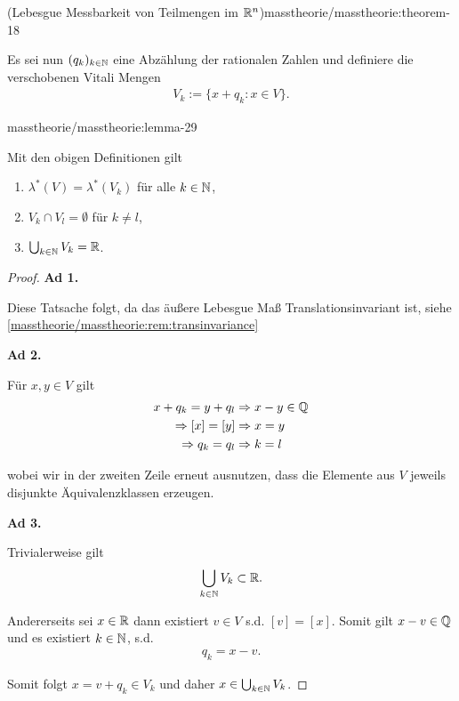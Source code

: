 \begin{theorem}{(Lebesgue Messbarkeit von Teilmengen im \protect\(\mathbb{R}^n\protect\))}{masstheorie/masstheorie:theorem-18}
\par
Es sei nun \((q_k)_{k\in\mathbb{N}}\) eine Abzählung der rationalen Zahlen und definiere die verschobenen Vitali Mengen
\begin{align*}
V_k :=\{x+q_k: x\in V\}.
\end{align*}\begin{lemma}{}{masstheorie/masstheorie:lemma-29}



\par
Mit den obigen Definitionen gilt
\begin{enumerate}

\item {} 
\par
\(\lambda^\ast(V) = \lambda^\ast(V_k)\) für alle \(k\in\mathbb{N}\),

\item {} 
\par
\(V_k\cap V_l=\emptyset\) für \(k\neq l\),

\item {} 
\par
\(\bigcup_{k\in\mathbb{N}} V_k = \mathbb{R}\).

\end{enumerate}
\end{lemma}

\begin{proof}
 

\par
\textbf{Ad 1.}

\par
Diese Tatsache folgt, da das äußere Lebesgue Maß Translationsinvariant ist, siehe \cref{masstheorie/masstheorie:rem:transinvariance} 

\par
\textbf{Ad 2.}

\par
Für \(x,y\in V\) gilt
\begin{align*}
x + q_k = y + q_l&\Rightarrow x-y\in\mathbb{Q}\\
\Rightarrow [x]=[y]&\Rightarrow x=y\\
\Rightarrow q_k=q_l&\Rightarrow k=l
\end{align*}
\par
wobei wir in der zweiten Zeile erneut ausnutzen, dass die Elemente aus \(V\) jeweils disjunkte Äquivalenzklassen erzeugen.

\par
\textbf{Ad 3.}

\par
Trivialerweise gilt
\begin{align*}
\bigcup_{k\in\mathbb{N}} V_k \subset \mathbb{R}.
\end{align*}
\par
Andererseits sei \(x\in\mathbb{R}\) dann existiert \(v\in V\) s.d. \([v] = [x]\). Somit gilt \(x-v\in\mathbb{Q}\) und es existiert \(k\in\mathbb{N}\), s.d.
\begin{align*}
q_k = x-v.
\end{align*}
\par
Somit folgt \(x=v+q_k\in V_k\) und daher \(x\in\bigcup_{k\in\mathbb{N}} V_k\).
\end{proof}


\end{theorem}
